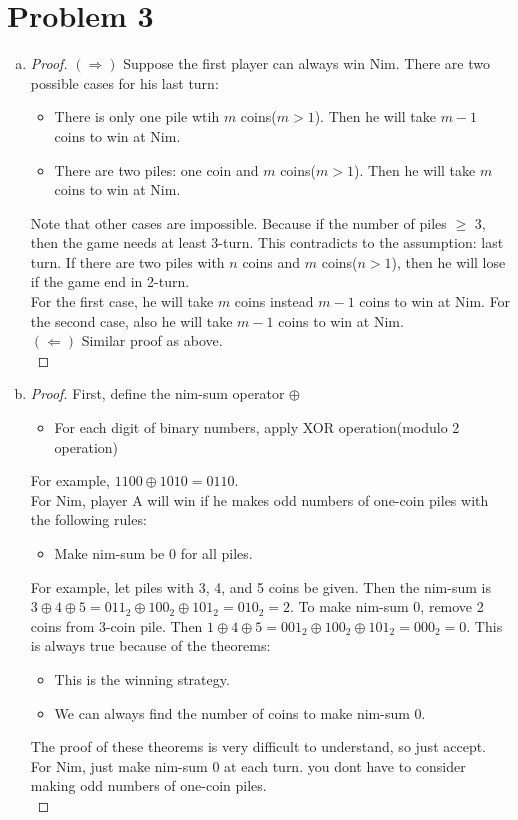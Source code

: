 \section*{Problem 3}
	\begin{enumerate} [(a)]
		\item \begin{proof}
			$(\Rightarrow)$ Suppose the first player can always win Nim. There are two possible cases for his last turn:
			\begin{itemize}
				\item There is only one pile wtih $m$ coins($m>1$). Then he will take $m - 1$ coins to win at Nim.
				\item There are two piles: one coin and $m$ coins($m>1$). Then he will take $m$ coins to win at Nim.
			\end{itemize}
			Note that other cases are impossible. Because if the number of piles $\geq$ 3, then the game needs at least 3-turn. This contradicts to the assumption: last turn. If there are two piles with $n$ coins and $m$ coins($n>1$), then he will lose if the game end in 2-turn.\\
			For the first case, he will take $m$ coins instead $m-1$ coins to win at Nim\textquotesingle. For the second case, also he will take $m-1$ coins to win at Nim\textquotesingle.\\
			$(\Leftarrow)$ Similar proof as above.\\
		\end{proof}
		\item \begin{proof}
			First, define the nim-sum operator $\oplus$
			\begin{itemize}
				\item [] For each digit of binary numbers, apply XOR operation(modulo 2 operation)
			\end{itemize}
			For example, $1100 \oplus 1010 = 0110$.\\
			For Nim, player A will win if he makes odd numbers of one-coin piles with the following rules:
			\begin{itemize}
				\item [] Make nim-sum be 0 for all piles. 
			\end{itemize}
			For example, let piles with 3, 4, and 5 coins be given. Then the nim-sum is $3\oplus4\oplus5 = 011_2\oplus100_2\oplus101_2=010_2=2$. To make nim-sum 0, remove 2 coins from 3-coin pile. Then $1\oplus4\oplus5 = 001_2\oplus100_2\oplus101_2=000_2=0$. This is always true because of the theorems:
			\begin{itemize}
				\item This is the winning strategy.
				\item We can always find the number of coins to make nim-sum 0.
			\end{itemize}
			The proof of these theorems is very difficult to understand, so just accept.\\
			For Nim\textquotesingle, just make nim-sum 0 at each turn. you don\textquotesingle t have to consider making odd numbers of one-coin piles.\\
		\end{proof}
	\end{enumerate}